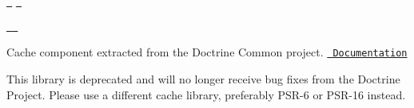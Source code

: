 \href{https://github.com/doctrine/cache/actions}{\texttt{ }} \href{https://codecov.io/gh/doctrine/cache/branch/1.10.x}{\texttt{ }}

\href{https://packagist.org/packages/doctrine/cache}{\texttt{ }} \href{https://packagist.org/packages/doctrine/cache}{\texttt{ }}

Cache component extracted from the Doctrine Common project. \href{https://www.doctrine-project.org/projects/doctrine-cache/en/current/index.html}{\texttt{ Documentation}}

This library is deprecated and will no longer receive bug fixes from the Doctrine Project. Please use a different cache library, preferably PSR-\/6 or PSR-\/16 instead. 